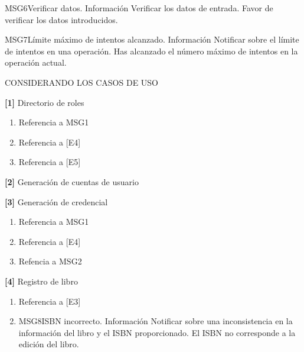 \begin{Citemize}
		\item
		\begin{Message}{MSG6}{Verificar datos.}
			\MSGitem[Tipo: ] Información
			\MSGitem[Objetivo: ] Verificar los datos de entrada.
			\MSGitem[Redacción: ] Favor de verificar los datos introducidos.
		\end{Message}
	
		\item
		\begin{Message}{MSG7}{Límite máximo de intentos alcanzado.}
			\MSGitem[Tipo: ] Información
			\MSGitem[Objetivo: ] Notificar sobre el límite de intentos en una operación.
			\MSGitem[Redacción: ] Has alcanzado el número máximo de intentos en la operación actual.
		\end{Message}
		
CONSIDERANDO LOS CASOS DE USO

	\item {\bf [1]} Directorio de roles
		\begin{enumerate}
			\item Referencia a MSG1
			\item Referencia a [E4]
			\item Referencia a [E5] 
		\end{enumerate}
	\item {\bf [2]} Generación de cuentas de usuario
	\item {\bf [3]} Generación de credencial
		\begin{enumerate}
			\item Referencia a MSG1
			\item Referencia a [E4]
			\item Refencia a MSG2
		\end{enumerate}		 
	\item {\bf [4]} Registro de libro
		\begin{enumerate}
			\item Referencia a [E3]
			\item
			\begin{Message}{MSG8}{ISBN incorrecto.}
				\MSGitem[Tipo: ] Información
				\MSGitem[Objetivo: ] Notificar sobre una inconsistencia en la información del libro y el ISBN proporcionado.
				\MSGitem[Redacción: ] El ISBN no corresponde a la edición del libro.
			\end{Message}
			

\end{enumerate}
\end{Citemize}
